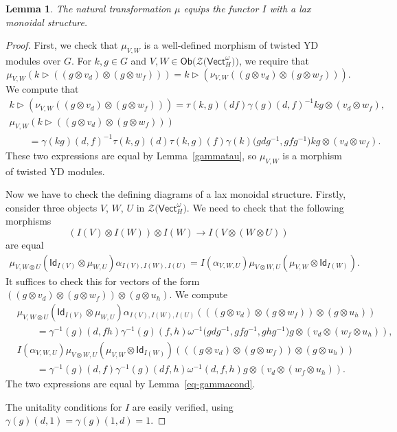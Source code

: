 \documentclass[10pt,a4paper]{amsart}
\numberwithin{equation}{section}
\newtheorem{Lemma}[Theorem]{Lemma}
\newcommand{\ide}{\mathsf{Id}}
\newcommand{\Ob}{\mathsf{Ob}}
\newcommand{\Vect}{\mathsf{Vect}}
\newcommand{\cZ}{\mathcal{Z}}
\newcommand{\rI}{I}
\begin{document}
\begin{Lemma}\label{lem:lax}
The natural transformation $\mu$ equips the functor $\rI$ with a lax monoidal structure.
\end{Lemma}
\begin{proof}
First, we check that $\mu_{V,W}$ is a well-defined morphism of twisted YD modules over $G$. For $k,g \in G$ and $V,W \in \Ob \big( \cZ\big(\Vect_H^\omega\big) \big)$, we require that \[\mu_{V,W}(k\vartriangleright ((g \otimes v_d) \otimes (g \otimes w_f))) = k \vartriangleright (\nu_{V,W}((g \otimes v_d) \otimes (g \otimes w_f))).\]
We compute that
\begin{gather*}
 k \vartriangleright (\nu_{V,W}((g \otimes v_d) \otimes (g \otimes w_f))) = \tau(k,g)(df)\gamma(g)(d,f)^{-1}kg \otimes (v_d \otimes w_f),\\
 \mu_{V,W}(k\vartriangleright ((g \otimes v_d) \otimes (g \otimes w_f))) \\
 \qquad{} = \gamma(kg)(d,f)^{-1}\tau(k,g)(d)\tau(k,g)(f) \gamma(k)\big(gdg^{-1},gfg^{-1}\big) kg \otimes (v_d \otimes w_f).
\end{gather*}
These two expressions are equal by Lemma~\ref{gammatau}, so $\mu_{V,W}$ is a morphism of twisted YD modules.

Now we have to check the defining diagrams of a lax monoidal structure. Firstly, consider three objects $V$, $W$, $U$ in $\cZ\big(\Vect_H^\omega\big)$. We need to check that the following morphisms
\[(\rI(V)\otimes \rI(W))\otimes \rI(W)\to \rI(V\otimes (W\otimes U))\] are equal
\begin{align*}
 \mu_{V,W\otimes U}(\ide_{\rI(V)}\otimes \mu_{W,U})\alpha_{\rI(V),\rI(W),\rI(U)}=\rI(\alpha_{V,W,U})\mu_{V\otimes W,U}(\mu_{V,W}\otimes \ide_{\rI(W)}).
\end{align*}
It suffices to check this for vectors of the form $((g\otimes v_d)\otimes (g\otimes w_f))\otimes (g\otimes u_h)$.
We compute
\begin{align*}
 &\mu_{V,W\otimes U}(\ide_{\rI(V)}\otimes \mu_{W,U})\alpha_{\rI(V),\rI(W),\rI(U)}(((g\otimes v_d)\otimes (g\otimes w_f))\otimes (g \otimes u_h))\\
 &\qquad =
\gamma^{-1}(g)(d, fh)\gamma^{-1}(g)(f,h)\omega^{-1}\big(gdg^{-1},gfg^{-1},ghg^{-1}\big)g\otimes (v_d\otimes (w_f\otimes u_h)),
 \\
&\rI(\alpha_{V,W,U})\mu_{V\otimes W,U}(\mu_{V,W}\otimes \ide_{\rI(W)})(((g\otimes v_d)\otimes (g\otimes w_f))\otimes (g \otimes u_h))\\
&\qquad = \gamma^{-1}(g)(d,f)\gamma^{-1}(g)(df,h)\omega^{-1}(d,f,h)g\otimes (v_d\otimes (w_f\otimes u_h)).
\end{align*}
The two expressions are equal by Lemma~\ref{eq-gammacond}.

The unitality conditions for $\rI$ are easily verified, using $\gamma(g)(d,1)=\gamma(g)(1,d)=1$.
\end{proof}
\end{document}

